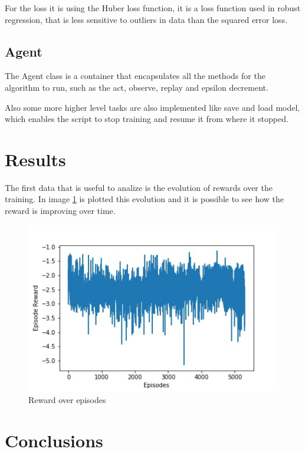 \documentclass{article}
\begin{document}
For the loss it is using the Huber loss function, it is a loss function used in robust regression, that is less sensitive to outliers in data than the squared error loss.

\subsection{Agent}
The Agent class is a container that encapsulates all the methods for the algorithm to run, such as the act, observe, replay and epsilon decrement.

Also some more higher level tasks are also implemented like save and load model, which enables the script to stop training and resume it from where it stopped.

\section{Results}
The first data that is useful to analize is the evolution of rewards over the training. In image \ref{fig:fig2} is plotted this evolution and it is possible to see how the reward is improving over time.

\begin{figure}[!ht]
\centering
\includegraphics[scale=0.6]{rewardOverEpisodes}
\caption{Reward over episodes}
\label{fig:fig2}
\end{figure}

\section{Conclusions}
\end{document}
